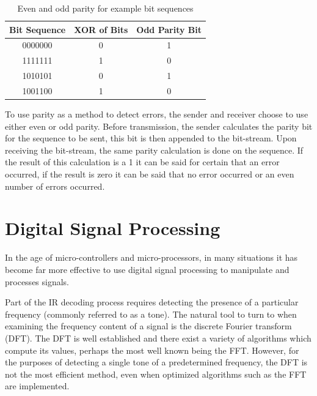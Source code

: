 \begin{table}[H]
	\centering
	\begin{tabular}{ccc}
		\hline
		\multicolumn{1}{l}{\textbf{Bit Sequence}} & \textbf{XOR of Bits} & \multicolumn{1}{l}{\textbf{Odd Parity Bit}} \\ \hline
		0000000 & 0 & 1 \\ \hline
		1111111 & 1 & 0 \\ \hline
		1010101 & 0 & 1 \\ \hline
		1001100 & 1 & 0 \\ \hline
	\end{tabular}
	\caption{Even and odd parity for example bit sequences}
	\label{tbl:party_examples}
\end{table}

 To use parity as a method to detect errors, the sender and receiver choose to use either even or odd parity. Before transmission, the sender calculates the parity bit for the sequence to be sent, this bit is then appended to the bit-stream. Upon receiving the bit-stream, the same parity calculation is done on the sequence. If the result of this calculation is a 1 it can be said for certain that an error occurred, if the result is zero it can be said that no error occurred or an even number of errors occurred.







\section{Digital Signal Processing}
In the age of micro-controllers and micro-processors, in many situations it has become far more effective to use digital signal processing to manipulate and processes signals.

Part of the IR decoding process requires detecting the presence of a particular frequency (commonly referred to as a tone). The natural tool to turn to when examining the frequency content of a signal is the discrete Fourier transform (DFT). The DFT is well established and there exist a variety of algorithms which compute its values, perhaps the most well known being the FFT. However, for the purposes of detecting a single tone of a predetermined frequency, the DFT is not the most efficient method, even when optimized algorithms such as the FFT are implemented.

